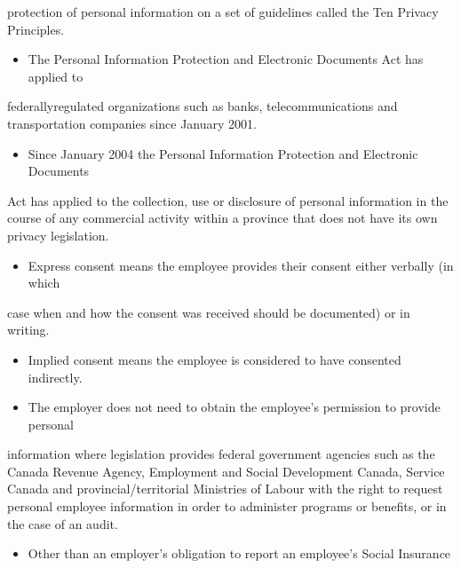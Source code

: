 \documentclass[letterpaper,10pt,english]{sphinxmanual}
\begin{document}
\sphinxAtStartPar
protection of personal information on a set of guidelines called the Ten Privacy
Principles.
\begin{itemize}
\item {} 
\sphinxAtStartPar
The Personal Information Protection and Electronic Documents Act has applied to

\end{itemize}

\sphinxAtStartPar
federally\sphinxhyphen{}regulated organizations such as banks, telecommunications and
transportation companies since January 2001.
\begin{itemize}
\item {} 
\sphinxAtStartPar
Since January 2004 the Personal Information Protection and Electronic Documents

\end{itemize}

\sphinxAtStartPar
Act has applied to the collection, use or disclosure of personal information in the
course of any commercial activity within a province that does not have its own
privacy legislation.
\begin{itemize}
\item {} 
\sphinxAtStartPar
Express consent means the employee provides their consent either verbally (in which

\end{itemize}

\sphinxAtStartPar
case when and how the consent was received should be documented) or in writing.
\begin{itemize}
\item {} 
\sphinxAtStartPar
Implied consent means the employee is considered to have consented indirectly.

\item {} 
\sphinxAtStartPar
The employer does not need to obtain the employee’s permission to provide personal

\end{itemize}

\sphinxAtStartPar
information where legislation provides federal government agencies such as the
Canada Revenue Agency, Employment and Social Development Canada, Service
Canada and provincial/territorial Ministries of Labour with the right to request
personal employee information in order to administer programs or benefits, or in the
case of an audit.
\begin{itemize}
\item {} 
\sphinxAtStartPar
Other than an employer’s obligation to report an employee’s Social Insurance

\end{itemize}
\end{document}
